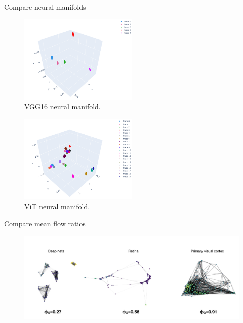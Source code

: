 \documentclass[xcolor={dvipsnames,svgnames}]{beamer}
\begin{document}
\begin{frame}{Compare neural manifolds}
        \begin{minipage}[t]{.45\linewidth}  
    \begin{figure}
            \includegraphics[width=0.5\textwidth]{presentation/embeddings/VGG16-2D-block1.png}
            \caption{VGG16 neural manifold.}
        \end{figure} 
    \end{minipage}
      \begin{minipage}[t]{.45\linewidth}   
      \begin{figure}         \includegraphics[width=0.5\textwidth]{presentation/embeddings/vit-2d-layer1.png}
      \caption{ViT neural manifold.}
            \end{figure} 
            
    \end{minipage}
\end{frame}
\begin{frame}{Compare mean flow ratios}
         \begin{figure}         \includegraphics[width=\textwidth]{presentation/embeddings/mean-flow-ratio-results.jpg}
            \end{figure} 
\end{frame}
\end{document}

